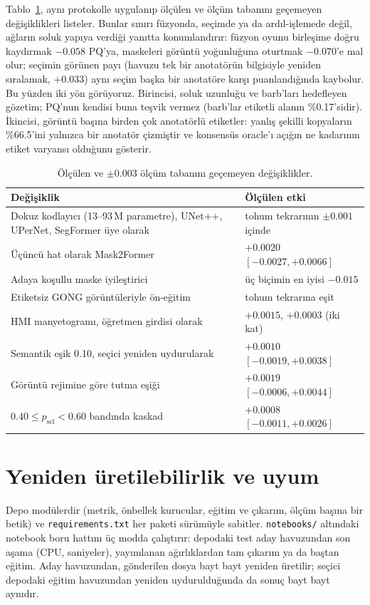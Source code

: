\documentclass[sigconf]{acmart}
\begin{document}
Tablo~\ref{tab:negative}, aynı protokolle uygulanıp ölçülen ve ölçüm tabanını geçemeyen değişiklikleri listeler. Bunlar sınırı füzyonda, seçimde ya da ardıl-işlemede değil, ağların soluk yapıya verdiği yanıtta konumlandırır: füzyon oyunu birleşime doğru kaydırmak $-0.058$ PQ'ya, maskeleri görüntü yoğunluğuna oturtmak $-0.070$'e mal olur; seçimin görünen payı (havuzu tek bir anotatörün bilgisiyle yeniden sıralamak, $+0.033$) aynı seçim başka bir anotatöre karşı puanlandığında kaybolur. Bu yüzden iki yön görüyoruz. Birincisi, soluk uzunluğu ve barb'ları hedefleyen gözetim; PQ'nun kendisi buna teşvik vermez (barb'lar etiketli alanın \%0.17'sidir). İkincisi, görüntü başına birden çok anotatörlü etiketler: yanlış şekilli kopyaların \%66.5'ini yalnızca bir anotatör çizmiştir ve konsensüs oracle'ı açığın ne kadarının etiket varyansı olduğunu gösterir.

\begin{table}[t]
  \caption{Ölçülen ve $\pm0.003$ ölçüm tabanını geçemeyen değişiklikler.}
  \label{tab:negative}
  \small
  \begin{tabular}{@{}p{}p{}@{}}
    \toprule
    Değişiklik & Ölçülen etki \\
    \midrule
    Dokuz kodlayıcı (13--93\,M parametre), UNet++, UPerNet, SegFormer üye olarak & tohum tekrarının $\pm0.001$ içinde \\
    Üçüncü hat olarak Mask2Former & $+0.0020$ $[-0.0027, +0.0066]$ \\
    Adaya koşullu maske iyileştirici & üç biçimin en iyisi $-0.015$ \\
    Etiketsiz GONG görüntüleriyle ön-eğitim & tohum tekrarına eşit \\
    HMI manyetogramı, öğretmen girdisi olarak & $+0.0015$, $+0.0003$ (iki kat) \\
    Semantik eşik 0.10, seçici yeniden uydurularak & $+0.0010$ $[-0.0019, +0.0038]$ \\
    Görüntü rejimine göre tutma eşiği & $+0.0019$ $[-0.0006, +0.0044]$ \\
    $0.40\leq p_\mathrm{sel}<0.60$ bandında kaskad & $+0.0008$ $[-0.0011, +0.0026]$ \\
    \bottomrule
  \end{tabular}
\end{table}

\section{Yeniden üretilebilirlik ve uyum}\label{sec:repro}
Depo modülerdir (metrik, önbellek kurucular, eğitim ve çıkarım, ölçüm başına bir betik) ve \texttt{requirements.txt} her paketi sürümüyle sabitler. \texttt{notebooks/} altındaki notebook boru hattını üç modda çalıştırır: depodaki test aday havuzundan son aşama (CPU, saniyeler), yayımlanan ağırlıklardan tam çıkarım ya da baştan eğitim. Aday havuzundan, gönderilen dosya bayt bayt yeniden üretilir; seçici depodaki eğitim havuzundan yeniden uydurulduğunda da sonuç bayt bayt aynıdır.
\end{document}
